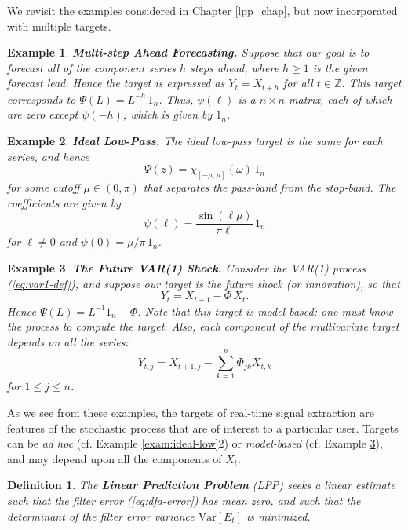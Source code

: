 \documentclass[a4paper]{book}
\def\ZZ{\mathbb Z}
\newtheorem{Definition}{Definition}
\newtheorem{Example}{Example}
\begin{document}
 We revisit the examples considered in Chapter \ref{lpp_chap}, but
 now incorporated with multiple targets.

\begin{Example} {\bf  Multi-step Ahead Forecasting.}   \rm
\label{exam:multi-step.fore2}
  Suppose that our goal is to forecast all of the component series 
 $h$ steps ahead, where $h \geq 1$ is the given {\em forecast lead}.
  Hence the target is expressed as  $  Y_t = X_{t+h}$
  for all $ t \in \ZZ$.  This target corresponds to
  $\Psi (L) = L^{-h} \, 1_n$.   Thus,   $\psi (\ell)$  is a $n \times n$
  matrix, each of which are zero except $\psi (-h)$,
 which is given by $1_n$.
\end{Example}

\begin{Example} {\bf Ideal Low-Pass.} \rm
\label{exam:ideal-low2}
  The ideal low-pass target is the same for each series, and hence
\[
  \Psi (z) = \chi_{ [ -\mu, \mu ]} (\omega) \,1_n
\]
 for some cutoff $\mu \in (0, \pi)$ that separates the pass-band from
the stop-band.   The coefficients are given by 
\[ 
  \psi (\ell) = \frac{ \sin (\ell \mu) }{ \pi \ell } \, 1_n
\]
 for $\ell \neq 0$ and $\psi (0) = \mu/\pi \, 1_n$.   
\end{Example}

\begin{Example} {\bf The Future VAR(1) Shock.}\rm
\label{exam:var1-shock}
  Consider the VAR(1) process (\ref{eq:var1-def}), and suppose our target is the future shock
  (or innovation), so that
\[
  Y_t = X_{t+1} - \Phi \, X_{t}.
\]
  Hence $\Psi (L) = L^{-1} 1_n - \Phi$.  Note that this target is model-based;
  one must know the process to compute the target.   Also, each component of
  the multivariate target depends on all the series:
\[
  Y_{t,j} = X_{t+1,j} -  \sum_{k=1}^n \Phi_{jk} X_{t,k}
\]
 for $1 \leq j \leq n$.
\end{Example}

As we see from these examples, the targets of real-time signal 
 extraction  are features of the stochastic process that are of interest to 
 a particular user.   Targets can be {\em ad hoc} 
 (cf. Example \ref{exam:ideal-low}2) or {\em model-based} (cf. Example \ref{exam:var1-shock}),
   and may   depend upon  all the components   of $X_t$.    
 

\begin{Definition} \rm
\label{def:lpp2}
 The {\bf Linear Prediction Problem} (LPP) seeks a linear estimate
    such that the filter error (\ref{eq:dfa-error})
 has mean zero, and  such that the determinant of the filter 
    error variance $\mbox{Var} [ E_t ]$ is minimized.
\end{Definition}
\end{document}
